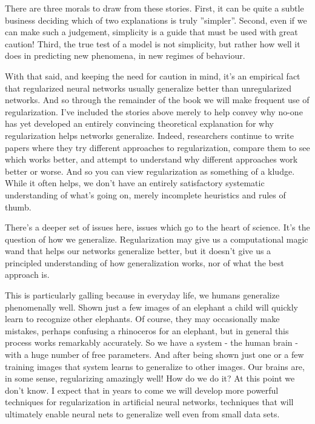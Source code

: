 There are three morals to draw from these stories. First, it can be quite a subtle business deciding which of two explanations is truly ''simpler''. Second, even if we can make such a judgement, simplicity is a guide that must be used with great caution! Third, the true test of a model is not simplicity, but rather how well it does in predicting new phenomena, in new regimes of behaviour.

With that said, and keeping the need for caution in mind, it's an empirical fact that regularized neural networks usually generalize better than unregularized networks. And so through the remainder of the book we will make frequent use of regularization. I've included the stories above merely to help convey why no-one has yet developed an entirely convincing theoretical explanation for why regularization helps networks generalize. Indeed, researchers continue to write papers where they try different approaches to regularization, compare them to see which works better, and attempt to understand why different approaches work better or worse. And so you can view regularization as something of a kludge. While it often helps, we don't have an entirely satisfactory systematic understanding of what's going on, merely incomplete heuristics and rules of thumb.

There's a deeper set of issues here, issues which go to the heart of science. It's the question of how we generalize. Regularization may give us a computational magic wand that helps our networks generalize better, but it doesn't give us a principled understanding of how generalization works, nor of what the best approach is.

This is particularly galling because in everyday life, we humans generalize phenomenally well. Shown just a few images of an elephant a child will quickly learn to recognize other elephants. Of course, they may occasionally make mistakes, perhaps confusing a rhinoceros for an elephant, but in general this process works remarkably accurately. So we have a system - the human brain - with a huge number of free parameters. And after being shown just one or a few training images that system learns to generalize to other images. Our brains are, in some sense, regularizing amazingly well! How do we do it? At this point we don't know. I expect that in years to come we will develop more powerful techniques for regularization in artificial neural networks, techniques that will ultimately enable neural nets to generalize well even from small data sets.

